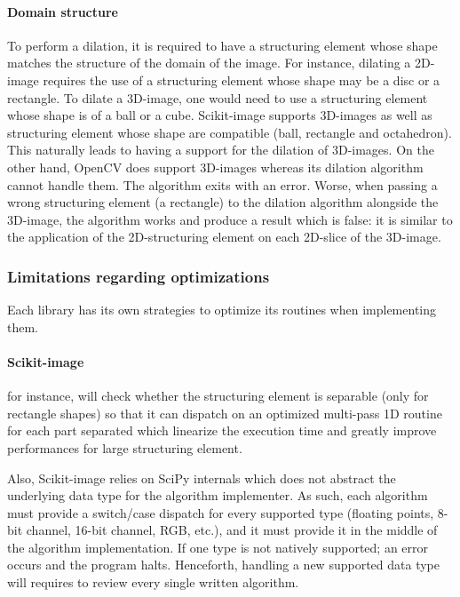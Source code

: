 \paragraph{Domain structure} To perform a dilation, it is required to have a structuring element whose shape matches the
structure of the domain of the image. For instance, dilating a 2D-image requires the use of a structuring element whose
shape may be a disc or a rectangle. To dilate a 3D-image, one would need to use a structuring element whose shape is of
a ball or a cube. Scikit-image supports 3D-images as well as structuring element whose shape are compatible (ball,
rectangle and octahedron). This naturally leads to having a support for the dilation of 3D-images. On the other hand,
OpenCV does support 3D-images whereas its dilation algorithm cannot handle them. The algorithm exits with an error.
Worse, when passing a wrong structuring element (a rectangle) to the dilation algorithm alongside the 3D-image, the
algorithm works and produce a result which is false: it is similar to the application of the 2D-structuring element on
each 2D-slice of the 3D-image.


\subsubsection{Limitations regarding optimizations}

Each library has its own strategies to optimize its routines when implementing them.

\paragraph{Scikit-image} for instance, will check whether the structuring element is separable (only for
rectangle shapes) so that it can dispatch on an optimized multi-pass 1D routine for each part separated which linearize
the execution time and greatly improve performances for large structuring element.

Also, Scikit-image relies on SciPy internals which does not abstract the underlying data type for the algorithm
implementer. As such, each algorithm must provide a switch/case dispatch for every supported type (floating points,
8-bit channel, 16-bit channel, RGB, etc.), and it must provide it in the middle of the algorithm implementation. If one
type is not natively supported; an error occurs and the program halts. Henceforth, handling a new supported data type
will requires to review every single written algorithm.

